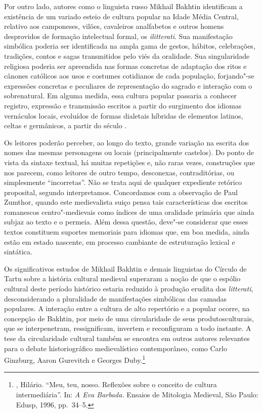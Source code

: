 Por outro lado, autores como o linguista russo Mikhail Bakhtin identificam a
existência de um variado esteio de cultura popular na Idade Média Central,
relativo aos camponeses, vilões, cavaleiros analfabetos e outros homens
desprovidos de formação intelectual formal, os \textit{ilitterati}. Sua
manifestação simbólica poderia ser identificada na ampla gama de gestos,
hábitos, celebrações, tradições, contos e sagas transmitidos pelo viés da
oralidade. Sua singularidade religiosa poderia ser apreendida nas formas
concretas de adaptação dos ritos e cânones católicos aos usos e costumes
cotidianos de cada população, forjando"-se expressões concretas e peculiares
de representação do sagrado e interação com o sobrenatural. Em alguma medida,
essa cultura popular passaria a conhecer registro, expressão e transmissão
escritos a partir do surgimento dos idiomas vernáculos locais, evoluídos de
formas dialetais híbridas de elementos latinos, celtas e germânicos, a partir
do século . 

Os leitores poderão perceber, ao longo do texto, grande variação na escrita dos nomes
das mesmas personagens ou locais (principalmente castelos). Do ponto de vista
da sintaxe textual, há muitas repetições e, não raras vezes, construções que nos parecem,
como leitores de outro tempo, desconexas, contraditórias, ou simplesmente ``incorretas''.
Não se trata aqui de qualquer expediente retórico proposital, segundo interpretamos.
Concordamos com a observação de Paul Zumthor, quando este medievalista suiço pensa
tais características dos escritos romanescos centro"-medievais como índices de uma
oralidade primária que ainda subjaz ao texto e o permeia. Além dessa questão, deve"-se
considerar que esses textos constituem suportes memoriais para idiomas que, em boa
medida, ainda estão em estado nascente, em processo cambiante de estruturação lexical e
sintática.

Os significativos estudos de Mikhail Bakhtin e demais linguistas do Círculo de
Tartu sobre a história cultural medieval superaram a noção de que o espólio
cultural deste período histórico estaria reduzido à produção erudita
dos \textit{litterati}, desconsiderando a pluralidade de manifestações
simbólicas das camadas populares. A interação entre a cultura de alto
repertório e a popular ocorre, na concepção de Bakhtin, por meio de uma
circularidade de seus produtosculturais, que se interpenetram, ressignificam,
invertem e reconfiguram a todo instante. A tese da circularidade cultural
também se encontra em outros autores relevantes para o debate historiográfico
medievalístico contemporâneo, como Carlo Ginzburg, Aaron Gurevitch e Georges
Duby.\footnote{ , Hilário. “Meu, teu, nosso. Reflexões sobre o conceito
de cultura intermediária”. In: \textit{A Eva Barbada. }Ensaios de Mitologia
Medieval, São Paulo: Edusp, 1996, pp.~34--5.  }

